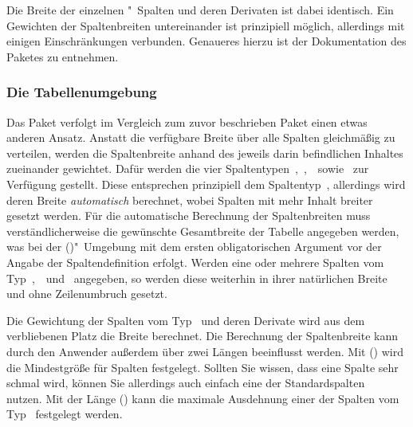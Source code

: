 \documentclass[%
  english,ngerman,%
  cdgeometry=no,DIV=12,%
  cd=false,cdfont=false,cdtitle=true,%
  headings=normal,%
  automark,%
  listof=toc,%
]{tudscrartcl}
\begin{document}
\InputCode\noindent
%
Die Breite der einzelnen "~Spalten und deren Derivaten ist dabei 
identisch. Ein Gewichten der Spaltenbreiten untereinander ist prinzipiell 
möglich, allerdings mit einigen Einschränkungen verbunden. Genaueres hierzu ist 
der Dokumentation des Paketes  zu entnehmen.

\subsubsection{Die Tabellenumgebung }
\label{sec:tabulary}%
%
Das Paket  verfolgt im Vergleich zum zuvor beschrieben Paket 
 einen etwas anderen Ansatz. Anstatt die verfügbare Breite 
über alle Spalten gleichmäßig zu verteilen, werden die Spaltenbreite anhand des 
jeweils darin befindlichen Inhaltes zueinander gewichtet. Dafür werden die vier 
Spaltentypen~,~,~~sowie~ zur Verfügung 
gestellt. Diese entsprechen prinzipiell dem Spaltentyp~, allerdings 
wird deren Breite \emph{automatisch} berechnet, wobei Spalten mit mehr Inhalt 
breiter gesetzt werden. Für die automatische Berechnung der Spaltenbreiten muss 
verständlicherweise die gewünschte Gesamtbreite der Tabelle angegeben werden, 
was bei der ()"~Umgebung mit dem ersten 
obligatorischen Argument vor der Angabe der Spaltendefinition erfolgt. Werden 
eine oder mehrere Spalten vom Typ~,~~und~ 
angegeben, so werden diese weiterhin in ihrer natürlichen Breite und ohne 
Zeilenumbruch gesetzt. 

Die Gewichtung der Spalten vom Typ~ und deren Derivate wird aus 
dem verbliebenen Platz die Breite berechnet. Die Berechnung der Spaltenbreite 
kann durch den Anwender außerdem über zwei Längen beeinflusst werden. Mit 
() wird die Mindestgröße für Spalten 
festgelegt. Sollten Sie wissen, dass eine Spalte sehr schmal wird, können Sie 
allerdings auch einfach eine der Standardspalten~ nutzen. Mit der 
Länge () kann die maximale Ausdehnung einer der 
Spalten vom Typ~ festgelegt werden. 
\end{document}
